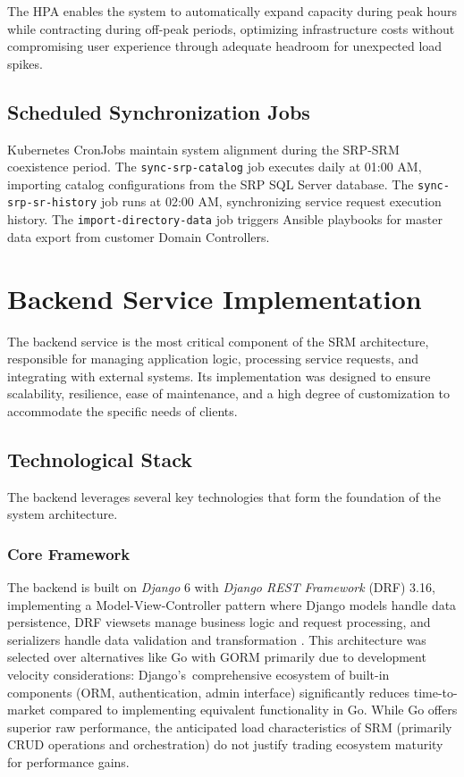 The HPA enables the system to automatically expand capacity during peak hours while contracting during off-peak periods, optimizing infrastructure costs without compromising user experience through adequate headroom for unexpected load spikes.

\subsection{Scheduled Synchronization Jobs}

Kubernetes CronJobs maintain system alignment during the SRP-SRM coexistence period. The \texttt{sync-srp-catalog} job executes daily at 01:00 AM, importing catalog configurations from the SRP SQL Server database. The \texttt{sync-srp-sr-history} job runs at 02:00 AM, synchronizing service request execution history. The \texttt{import-directory-data} job triggers Ansible playbooks for master data export from customer Domain Controllers.

\section{Backend Service Implementation}

The backend service is the most critical component of the SRM architecture, responsible for managing application logic, processing service requests, and integrating with external systems. Its implementation was designed to ensure scalability, resilience, ease of maintenance, and a high degree of customization to accommodate the specific needs of clients.

\subsection{Technological Stack}

The backend leverages several key technologies that form the foundation of the system architecture.

\subsubsection{Core Framework}

The backend is built on \textit{Django} 6 with \textit{Django REST Framework} (DRF) 3.16, implementing a Model-View-Controller pattern where Django models handle data persistence, DRF viewsets manage business logic and request processing, and serializers handle data validation and transformation \cite{django}\cite{django_rest_framework}. This architecture was selected over alternatives like Go with GORM primarily due to development velocity considerations: Django's~comprehensive ecosystem of built-in components (ORM, authentication, admin interface) significantly reduces time-to-market compared to implementing equivalent functionality in Go. While Go offers superior raw performance, the anticipated load characteristics of SRM (primarily CRUD operations and orchestration) do not justify trading ecosystem maturity for performance gains.

